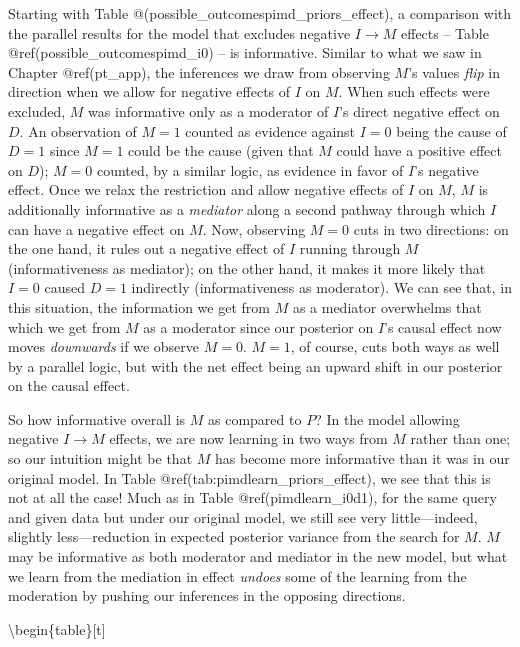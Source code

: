 \documentclass[12pt,]{book}
\begin{document}
Starting with Table @(possible\_outcomespimd\_priors\_effect), a comparison with the parallel results for the model that excludes negative \(I \rightarrow M\) effects -- Table @ref(possible\_outcomespimd\_i0) -- is informative. Similar to what we saw in Chapter @ref(pt\_app), the inferences we draw from observing \(M\)'s values \emph{flip} in direction when we allow for negative effects of \(I\) on \(M\). When such effects were excluded, \(M\) was informative only as a moderator of \(I\)'s direct negative effect on \(D\). An observation of \(M=1\) counted as evidence against \(I=0\) being the cause of \(D=1\) since \(M=1\) could be the cause (given that \(M\) could have a positive effect on \(D\)); \(M=0\) counted, by a similar logic, as evidence in favor of \(I\)'s negative effect. Once we relax the restriction and allow negative effects of \(I\) on \(M\), \(M\) is additionally informative as a \emph{mediator} along a second pathway through which \(I\) can have a negative effect on \(M\). Now, observing \(M=0\) cuts in two directions: on the one hand, it rules out a negative effect of \(I\) running through \(M\) (informativeness as mediator); on the other hand, it makes it more likely that \(I=0\) caused \(D=1\) indirectly (informativeness as moderator). We can see that, in this situation, the information we get from \(M\) as a mediator overwhelms that which we get from \(M\) as a moderator since our posterior on \(I\)'s causal effect now moves \emph{downwards} if we observe \(M=0\). \(M=1\), of course, cuts both ways as well by a parallel logic, but with the net effect being an upward shift in our posterior on the causal effect.

So how informative overall is \(M\) as compared to \(P\)? In the model allowing negative \(I \rightarrow M\) effects, we are now learning in two ways from \(M\) rather than one; so our intuition might be that \(M\) has become more informative than it was in our original model. In Table @ref(tab:pimdlearn\_priors\_effect), we see that this is not at all the case! Much as in Table @ref(pimdlearn\_i0d1), for the same query and given data but under our original model, we still see very little---indeed, slightly less---reduction in expected posterior variance from the search for \(M\). \(M\) may be informative as both moderator and mediator in the new model, but what we learn from the mediation in effect \emph{undoes} some of the learning from the moderation by pushing our inferences in the opposing directions.

\textbackslash{}begin\{table\}{[}t{]}
\end{document}
